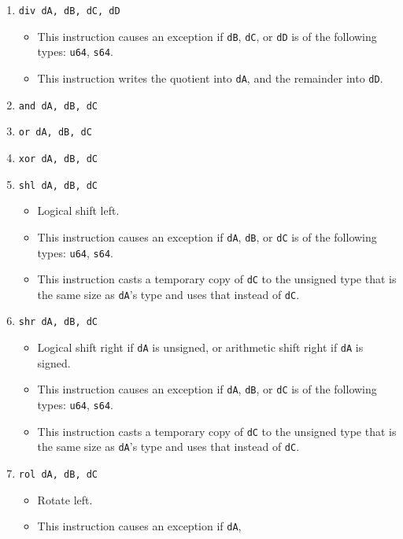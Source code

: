 \documentclass{article}
\begin{document}
\begin{itemize}
\begin{enumerate}
			\item \texttt{div dA, dB, dC, dD}
				\begin{itemize}
				\item This instruction causes an exception if \texttt{dB},
					\texttt{dC}, or \texttt{dD} is of the following types:
					\texttt{u64}, \texttt{s64}.

				\item This instruction writes the quotient into
					\texttt{dA}, and the remainder into \texttt{dD}.
				\end{itemize}
			\item \texttt{and dA, dB, dC}
			\item \texttt{or dA, dB, dC}
			\item \texttt{xor dA, dB, dC}

			\item \texttt{shl dA, dB, dC}
				\begin{itemize}
				\item Logical shift left.
				\item This instruction causes an exception if \texttt{dA},
					\texttt{dB}, or \texttt{dC} is of the following types:
					\texttt{u64}, \texttt{s64}.
				\item This instruction casts a temporary copy of
					\texttt{dC} to the unsigned type that is the same size
					as \texttt{dA}'s type and uses that instead of
					\texttt{dC}.
				\end{itemize}
			\item \texttt{shr dA, dB, dC}
				\begin{itemize}
				\item Logical shift right if \texttt{dA} is unsigned, or
					arithmetic shift right if \texttt{dA} is signed.
				\item This instruction causes an exception if \texttt{dA},
					\texttt{dB}, or \texttt{dC} is of the following types:
					\texttt{u64}, \texttt{s64}.
				\item This instruction casts a temporary copy of
					\texttt{dC} to the unsigned type that is the same size
					as \texttt{dA}'s type and uses that instead of
					\texttt{dC}.
				\end{itemize}
			\item \texttt{rol dA, dB, dC}
				\begin{itemize}
				\item Rotate left.
				\item This instruction causes an exception if \texttt{dA},

\end{itemize}
\end{enumerate}
\end{itemize}
\end{document}
